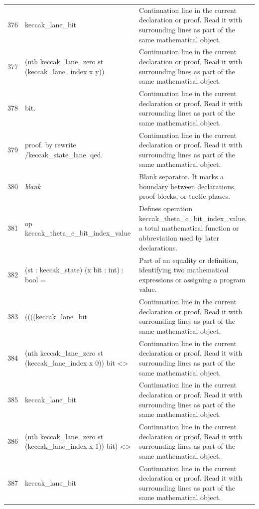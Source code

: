 \documentclass[10pt]{article}
\begin{document}
\begin{longtable}{r L{0.53\textwidth} L{0.37\textwidth}}
376 & {\ttfamily\scriptsize   keccak\_lane\_bit} & Continuation line in the current declaration or proof.  Read it with surrounding lines as part of the same mathematical object. \\
377 & {\ttfamily\scriptsize     (nth keccak\_lane\_zero st (keccak\_lane\_index x y))} & Continuation line in the current declaration or proof.  Read it with surrounding lines as part of the same mathematical object. \\
378 & {\ttfamily\scriptsize     bit.} & Continuation line in the current declaration or proof.  Read it with surrounding lines as part of the same mathematical object. \\
379 & {\ttfamily\scriptsize proof. by rewrite /keccak\_state\_lane. qed.} & Continuation line in the current declaration or proof.  Read it with surrounding lines as part of the same mathematical object. \\
380 & {\ttfamily\scriptsize \emph{blank}} & Blank separator.  It marks a boundary between declarations, proof blocks, or tactic phases. \\
381 & {\ttfamily\scriptsize op keccak\_theta\_c\_bit\_index\_value} & Defines operation keccak\_theta\_c\_bit\_index\_value, a total mathematical function or abbreviation used by later declarations. \\
382 & {\ttfamily\scriptsize    (st : keccak\_state) (x bit : int) : bool =} & Part of an equality or definition, identifying two mathematical expressions or assigning a program value. \\
383 & {\ttfamily\scriptsize   ((((keccak\_lane\_bit} & Continuation line in the current declaration or proof.  Read it with surrounding lines as part of the same mathematical object. \\
384 & {\ttfamily\scriptsize         (nth keccak\_lane\_zero st (keccak\_lane\_index x 0)) bit <>} & Continuation line in the current declaration or proof.  Read it with surrounding lines as part of the same mathematical object. \\
385 & {\ttfamily\scriptsize       keccak\_lane\_bit} & Continuation line in the current declaration or proof.  Read it with surrounding lines as part of the same mathematical object. \\
386 & {\ttfamily\scriptsize         (nth keccak\_lane\_zero st (keccak\_lane\_index x 1)) bit) <>} & Continuation line in the current declaration or proof.  Read it with surrounding lines as part of the same mathematical object. \\
387 & {\ttfamily\scriptsize      keccak\_lane\_bit} & Continuation line in the current declaration or proof.  Read it with surrounding lines as part of the same mathematical object. \\

\end{longtable}
\end{document}
